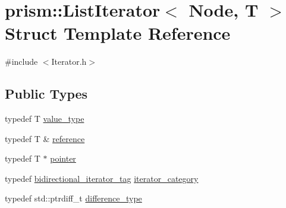 \hypertarget{structprism_1_1_list_iterator}{}\section{prism\+:\+:List\+Iterator$<$ Node, T $>$ Struct Template Reference}
\label{structprism_1_1_list_iterator}


{\ttfamily \#include $<$Iterator.\+h$>$}

\subsection*{Public Types}
\begin{DoxyCompactItemize}
\item 
typedef T \hyperlink{structprism_1_1_list_iterator_a9df2822c03b49086c3ddf55ac4816321}{value\+\_\+type}
\item 
typedef T \& \hyperlink{structprism_1_1_list_iterator_a8102dfe3c26bb09d44c54ce276debf69}{reference}
\item 
typedef T $\ast$ \hyperlink{structprism_1_1_list_iterator_a7df7f6f08916f0bbe2e0b0ce675e0cee}{pointer}
\item 
typedef \hyperlink{structprism_1_1bidirectional__iterator__tag}{bidirectional\+\_\+iterator\+\_\+tag} \hyperlink{structprism_1_1_list_iterator_a3accec188667cc3b84dca49151b83b95}{iterator\+\_\+category}
\item 
typedef std\+::ptrdiff\+\_\+t \hyperlink{structprism_1_1_list_iterator_a1353d7adf61676d3913acaa1b00fed94}{difference\+\_\+type}
\end{DoxyCompactItemize}
